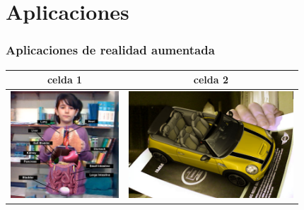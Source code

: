 \section{Aplicaciones}
\frame
{
\frametitle{Aplicaciones de realidad aumentada}
{\setlength{\arrayrulewidth}{0mm}
  \begin{tabular}{| c | c |}
  \hline
  celda 1 & celda 2\\
  \hline
  \includegraphics[height=4cm]{imgs/raeducacion.png} & \includegraphics[height=4cm]{imgs/minira.jpg}\\
  \hline
  \end{tabular}
}
}
